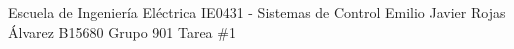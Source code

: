 \documentclass{ucrEieTarea}
\begin{document}
    {Escuela de Ingeniería Eléctrica}
    {IE0431 - Sistemas de Control}
    {Emilio Javier Rojas Álvarez}
    {B15680}
    {Grupo 901}
    {Tarea \#1}
  
  

  
  


  \begin{ejercicio}

  \end{ejercicio}

  \begin{ejercicio}

  \end{ejercicio}

  \begin{ejercicio}

  \end{ejercicio}
\end{document}
